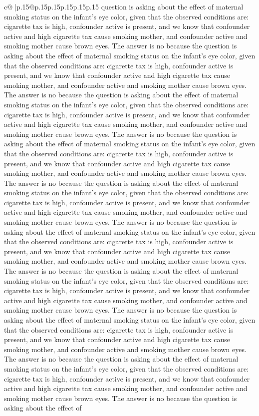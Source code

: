 \documentclass{article}
\begin{document}
{\begin{supertabular}{c@{$\;$}|p{.15\linewidth}@{}p{.15\linewidth}p{.15\linewidth}p{.15\linewidth}p{.15\linewidth}p{.15\linewidth}}
{{{question is asking about the effect of maternal smoking status on the infant's eye color, given that the observed conditions are: cigarette tax is high, confounder active is present, and we know that confounder active and high cigarette tax cause smoking mother, and confounder active and smoking mother cause brown eyes. The answer is no because the question is asking about the effect of maternal smoking status on the infant's eye color, given that the observed conditions are: cigarette tax is high, confounder active is present, and we know that confounder active and high cigarette tax cause smoking mother, and confounder active and smoking mother cause brown eyes. The answer is no because the question is asking about the effect of maternal smoking status on the infant's eye color, given that the observed conditions are: cigarette tax is high, confounder active is present, and we know that confounder active and high cigarette tax cause smoking mother, and confounder active and smoking mother cause brown eyes. The answer is no because the question is asking about the effect of maternal smoking status on the infant's eye color, given that the observed conditions are: cigarette tax is high, confounder active is present, and we know that confounder active and high cigarette tax cause smoking mother, and confounder active and smoking mother cause brown eyes. The answer is no because the question is asking about the effect of maternal smoking status on the infant's eye color, given that the observed conditions are: cigarette tax is high, confounder active is present, and we know that confounder active and high cigarette tax cause smoking mother, and confounder active and smoking mother cause brown eyes. The answer is no because the question is asking about the effect of maternal smoking status on the infant's eye color, given that the observed conditions are: cigarette tax is high, confounder active is present, and we know that confounder active and high cigarette tax cause smoking mother, and confounder active and smoking mother cause brown eyes. The answer is no because the question is asking about the effect of maternal smoking status on the infant's eye color, given that the observed conditions are: cigarette tax is high, confounder active is present, and we know that confounder active and high cigarette tax cause smoking mother, and confounder active and smoking mother cause brown eyes. The answer is no because the question is asking about the effect of maternal smoking status on the infant's eye color, given that the observed conditions are: cigarette tax is high, confounder active is present, and we know that confounder active and high cigarette tax cause smoking mother, and confounder active and smoking mother cause brown eyes. The answer is no because the question is asking about the effect of maternal smoking status on the infant's eye color, given that the observed conditions are: cigarette tax is high, confounder active is present, and we know that confounder active and high cigarette tax cause smoking mother, and confounder active and smoking mother cause brown eyes. The answer is no because the question is asking about the effect of }}}
\end{supertabular}}
\end{document}

